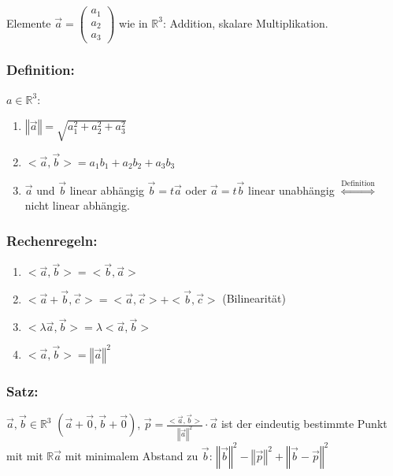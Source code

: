 %
%
%
Elemente $\vec{a} = \begin{pmatrix}a_{1} \\ a_{2} \\ a_{3} \end{pmatrix}$
 wie in $\mathbb{R}^{3}$: Addition, skalare Multiplikation. \\
%
%
%
\subsubsection{Definition:}
$a \in \mathbb{R}^{3}$:
\begin{enumerate}
 \item $\left\Vert\vec{a}\right\Vert = \sqrt{a_{1}^{2} + a_{2}^{2} + a_{3}^{2}}$
 \item ${<}\vec{a}, \vec{b}{>} = a_{1}b_{1} + a_{2}b_{2} + a_{3}b_{3}$
 \item $ \vec{a}$ und $\vec{b}$ linear abhängig $\vec{b} = t\vec{a}$ oder $\vec{a} = t\vec{b}$
 linear unabhängig $\mathop{\Leftrightarrow}\limits^{\text{Definition}}$ nicht linear abhängig.
\end{enumerate}
%
%
%
\subsubsection{Rechenregeln:}
\begin{enumerate}
 \item ${<}\vec{a}, \vec{b}{>} = {<}\vec{b}, \vec{a}{>}$
 \item ${<}\vec{a} + \vec{b}, \vec{c}{>} = <\vec{a}, \vec{c}> + <\vec{b}, \vec{c}>$ (Bilinearität)
 \item $<\lambda\vec{a}, \vec{b}> = \lambda <\vec{a}, \vec{b}>$
 \item $<\vec{a}, \vec{b}> = \left\Vert\vec{a}\right\Vert^{2}$
\end{enumerate}
%
%
%
\subsubsection{Satz:}
$\vec{a},\vec{b} \in \mathbb{R}^3$ $(\vec{a} + \vec{0}, \vec{b} + \vec{0})$, 
$\vec{p}=\frac{<\vec{a},\vec{b}>}{\left\Vert\vec{a}\right\Vert^{2}} \cdot\vec{a}$
ist der eindeutig bestimmte Punkt mit mit $\mathbb{R}\vec{a}$ mit minimalem Abstand zu $\vec{b}$:
$ \left\Vert\vec{b}\right\Vert^{2} - \left\Vert\vec{p}\right\Vert^{2} + \left\Vert\vec{b} - \vec{p}\right\Vert^{2}$
%
%
